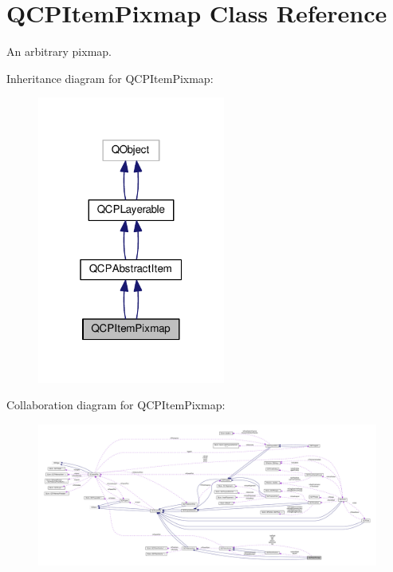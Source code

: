 \hypertarget{class_q_c_p_item_pixmap}{}\section{Q\+C\+P\+Item\+Pixmap Class Reference}
\label{class_q_c_p_item_pixmap}


An arbitrary pixmap.  




Inheritance diagram for Q\+C\+P\+Item\+Pixmap\+:\nopagebreak
\begin{figure}[H]
\begin{center}
\leavevmode
\includegraphics[width=175pt]{class_q_c_p_item_pixmap__inherit__graph}
\end{center}
\end{figure}


Collaboration diagram for Q\+C\+P\+Item\+Pixmap\+:\nopagebreak
\begin{figure}[H]
\begin{center}
\leavevmode
\includegraphics[width=350pt]{class_q_c_p_item_pixmap__coll__graph}
\end{center}
\end{figure}
